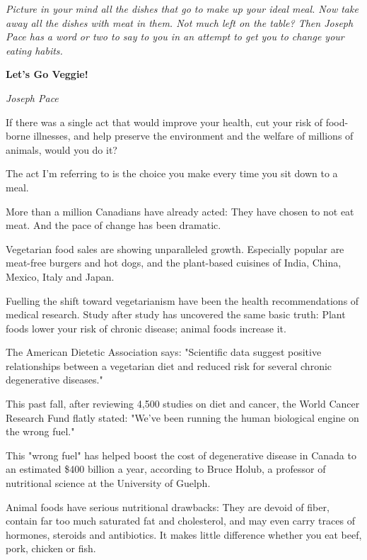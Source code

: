 \documentclass[a4paper]{article}
\title{}
\author{}
\date{}
\begin{document}
\maketitle
\textsf{\textsl{ Picture in your mind all the dishes that go to make up your ideal meal. Now take away all the dishes with meat in them. Not much left on the table?  Then Joseph Pace has a word or two to say to you in an attempt to get you to change your eating habits.}}

\begin{center}
    \textbf{\huge Let's Go Veggie!}
\end{center}

\begin{flushright}
    \textsf{\textit{Joseph Pace}}
\end{flushright}

If there was a single act that would improve your health, cut your risk of food-borne illnesses, and help preserve the environment and the welfare of millions of animals, would you do it?

The act I'm referring to is the choice you make every time you sit down to a meal.


More than a million Canadians have already acted: They have chosen to not eat meat. And the pace of change has been dramatic.

Vegetarian food sales are showing unparalleled growth. Especially popular are meat-free burgers and hot dogs, and the plant-based cuisines of India, China, Mexico, Italy and Japan.

Fuelling the shift toward vegetarianism have been the health recommendations of medical research. Study after study has uncovered the same basic truth: Plant foods lower your risk of chronic disease; animal foods increase it.

The American Dietetic Association says: "Scientific data suggest positive relationships between a vegetarian diet and reduced risk for several chronic degenerative diseases."

This past fall, after reviewing 4,500 studies on diet and cancer, the World Cancer Research Fund flatly stated: "We've been running the human biological engine on the wrong fuel."

This "wrong fuel" has helped boost the cost of degenerative disease in Canada to an estimated \$400 billion a year, according to Bruce Holub, a professor of nutritional science at the University of Guelph.

Animal foods have serious nutritional drawbacks: They are devoid of fiber, contain far too much saturated fat and cholesterol, and may even carry traces of hormones, steroids and antibiotics. It makes little difference whether you eat beef, pork, chicken or fish.
\end{document}
